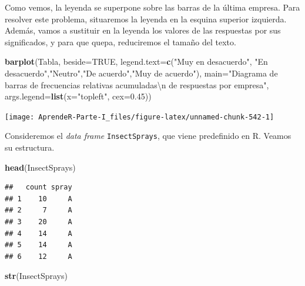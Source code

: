 \documentclass[]{book}
\newenvironment{Shaded}{\begin{snugshade}}{\end{snugshade}}
\newcommand{\CharTok}[1]{\textcolor[rgb]{0.31,0.60,0.02}{#1}}
\newcommand{\DataTypeTok}[1]{\textcolor[rgb]{0.13,0.29,0.53}{#1}}
\newcommand{\FloatTok}[1]{\textcolor[rgb]{0.00,0.00,0.81}{#1}}
\newcommand{\KeywordTok}[1]{\textcolor[rgb]{0.13,0.29,0.53}{\textbf{#1}}}
\newcommand{\NormalTok}[1]{#1}
\newcommand{\OtherTok}[1]{\textcolor[rgb]{0.56,0.35,0.01}{#1}}
\newcommand{\StringTok}[1]{\textcolor[rgb]{0.31,0.60,0.02}{#1}}
\theoremstyle{definition}
\theoremstyle{definition}
\theoremstyle{definition}
\theoremstyle{remark}
\let\BeginKnitrBlock\begin \let\EndKnitrBlock\end
\begin{document}
Como vemos, la leyenda se superpone sobre las barras de la última empresa. Para resolver este problema, situaremos la leyenda en la esquina superior izquierda. Además, vamos a sustituir en la leyenda los valores de las respuestas por sus significados, y para que quepa, reduciremos el tamaño del texto.

\begin{Shaded}
\begin{Highlighting}[]
\KeywordTok{barplot}\NormalTok{(Tabla, }\DataTypeTok{beside=}\OtherTok{TRUE}\NormalTok{, }
        \DataTypeTok{legend.text=}\KeywordTok{c}\NormalTok{(}\StringTok{"Muy en desacuerdo"}\NormalTok{, }\StringTok{"En desacuerdo"}\NormalTok{,}\StringTok{"Neutro"}\NormalTok{,}\StringTok{"De acuerdo"}\NormalTok{,}\StringTok{"Muy de acuerdo"}\NormalTok{), }
        \DataTypeTok{main=}\StringTok{"Diagrama de barras de frecuencias relativas acumuladas}\CharTok{\textbackslash{}n}\StringTok{ de respuestas por empresa"}\NormalTok{,}
        \DataTypeTok{args.legend=}\KeywordTok{list}\NormalTok{(}\DataTypeTok{x=}\StringTok{"topleft"}\NormalTok{, }\DataTypeTok{cex=}\FloatTok{0.45}\NormalTok{))}
\end{Highlighting}
\end{Shaded}

\begin{center}\texttt{[image: AprendeR-Parte-I\_files/figure-latex/unnamed-chunk-542-1]} \end{center}

\BeginKnitrBlock{example}
\protect\hypertarget{exm:sprayord}{}{\label{exm:sprayord} }Consideremos el \emph{data frame} \texttt{InsectSprays}, que viene predefinido en R. Veamos su estructura.
\EndKnitrBlock{example}

\begin{Shaded}
\begin{Highlighting}[]
\KeywordTok{head}\NormalTok{(InsectSprays)}
\end{Highlighting}
\end{Shaded}

\begin{verbatim}
##   count spray
## 1    10     A
## 2     7     A
## 3    20     A
## 4    14     A
## 5    14     A
## 6    12     A
\end{verbatim}

\begin{Shaded}
\begin{Highlighting}[]
\KeywordTok{str}\NormalTok{(InsectSprays)}
\end{Highlighting}
\end{Shaded}
\end{document}
